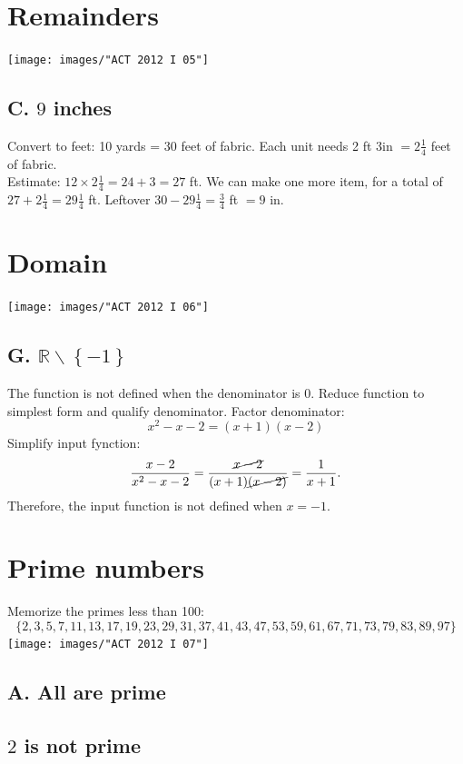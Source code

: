 \documentclass[11pt, oneside]{article}
\begin{document}
\section{Remainders}
\texttt{[image: images/"ACT 2012 I 05"]}
\subsection{C. $9$ inches}
Convert to feet: 10 yards = 30 feet of fabric. Each unit needs 2 ft 3in $= 2\frac{1}{4}$ feet of fabric.\\ 

\noindent Estimate: $12 \times 2\frac{1}{4} = 24 + 3 = 27$ ft. We can make one more item, for a total of $27 + 2\frac{1}{4} = 29\frac{1}{4}$ ft. Leftover $30-29\frac{1}{4}=\frac{3}{4}$ ft $=9$ in.

\section{Domain}
\texttt{[image: images/"ACT 2012 I 06"]}
\subsection{G. $\mathbb{R}\backslash\left\{-1\right\}$}
The function is not defined when the denominator is $0$. Reduce function to simplest form and qualify denominator. Factor denominator: 
$$x^2-x-2 = (x+1)(x-2)$$
Simplify input fynction:
$$\frac{x-2}{x^2-x-2} = \frac{\cancel{x-2}}{(x+1)\cancel{(x-2)}} = \frac{1}{x+1}.$$
Therefore, the input function is not defined when $x=-1$.

\section{Prime numbers}
Memorize the primes less than 100:
$$\{2,3,5,7,11,13,17,19,23,29,31,37,41,43,47,53,59,61,67,71,73,79,83,89,97\}$$
\texttt{[image: images/"ACT 2012 I 07"]}
\subsection{A. All are prime}
\subsection{{\color{blue}{B.}} $2$ is not prime}
\end{document}
